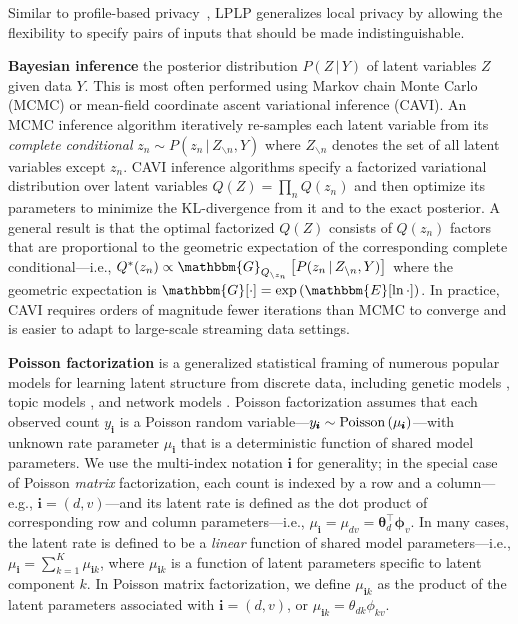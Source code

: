 \documentclass{article}
\newcommand{\subs}{\pmb{i}}
\newcommand{\ys}{y_{\subs}}
\newcommand{\mus}{\mu_{\subs}}
\newcommand{\musk}{\mu_{\subs k}}
\newcommand{\Pois}[1]{\textup{Poisson}\left( #1 \right)}
\newcommand{\Gqnot}[2]{\mathbbm{G}_{Q_{\backslash #1}}\left[#2\right]}
\newcommand{\teq}{\!=\!}
\begin{document}
Similar to profile-based privacy~\cite{GC19}, LPLP generalizes local
privacy by allowing the flexibility to specify pairs of inputs that
should be made indistinguishable.


  \textbf{Bayesian inference}  the posterior
  distribution $P(Z\,|\,Y)$ of latent variables $Z$ given data $Y$. This is
  most often performed using Markov chain Monte Carlo (MCMC) or mean-field
  coordinate ascent variational inference (CAVI). An MCMC inference algorithm
  iteratively re-samples each latent variable from its \emph{complete
  conditional} $z_n \sim P(z_n\,|\,Z_{\backslash n}, Y)$ where $Z_{\backslash
  n}$ denotes the set of all latent variables except $z_n$. CAVI inference
  algorithms specify a factorized variational distribution over latent
  variables $Q(Z) = \prod_n Q(z_n)$ and then optimize its parameters to
  minimize the KL-divergence from it and to the exact posterior. A general
  result is that the optimal factorized $Q(Z)$ consists of $Q(z_n)$ factors
  that are proportional to the geometric expectation of the corresponding
  complete conditional---i.e., $Q^*(z_n) \propto
  \Gqnot{z_n}{P(z_n\,|\,Z_{\backslash n}, Y)}$ where the geometric expectation
  is $\mathbbm{G}[\cdot]=\exp\left(\mathbbm{E}[\ln \cdot]\right)$. In
  practice, CAVI requires orders of magnitude fewer iterations than MCMC to
  converge and is easier to adapt to large-scale streaming data settings.
  
  \textbf{Poisson factorization}
  \citep{titsias2008infinite,cemgil2009bayesian,zhou2012augment,gopalan2013efficient,paisley2014bayesian}
  is a generalized statistical framing of numerous popular models for learning
  latent structure from discrete data, including genetic models
  \citep{pritchard2000inference}, topic models \citep{blei2003latent}, and
  network models
  \citep{ball2011efficient,gopalan2013efficient,zhou2015infinite}. Poisson
  factorization assumes that each observed count $\ys$ is a Poisson random
  variable---$\ys \sim \Pois{\mus}$---with unknown rate parameter $\mus$ that is
  a deterministic function of shared model parameters. We use the multi-index
  notation $\subs$ for generality; in the special case of Poisson \emph{matrix}
  factorization, each count is indexed by a row and a column---e.g., $\subs
  \!=\! (d, v)$---and its latent rate is defined as the dot product of
  corresponding row and column parameters---i.e., $\mus \teq \mu_{dv} \teq
  \boldsymbol{\theta}_d^{\top} \boldsymbol{\phi}_v$. In many cases, the latent
  rate is defined to be a \emph{linear} function of shared model
  parameters---i.e., $\mus = \sum_{k=1}^K \musk$, where $\musk$ is a function of
  latent parameters specific to latent component $k$. In Poisson matrix
  factorization, we define $\musk$ as the product of the latent parameters
  associated with $\subs = (d, v)$, or $\musk = \theta_{dk}\phi_{kv}$.
  
\end{document}
